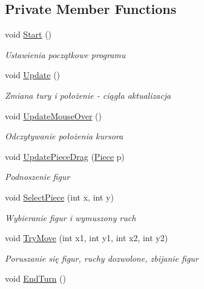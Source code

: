 \subsection*{Private Member Functions}
\begin{DoxyCompactItemize}
\item 
void \mbox{\hyperlink{class_checkers_board_ac7cf49c7fdf75af75997b2fb2fba0d2e}{Start}} ()
\begin{DoxyCompactList}\small\item\em Ustawienia początkowe programu \end{DoxyCompactList}\item 
void \mbox{\hyperlink{class_checkers_board_acb916ec6544b35e39f2eba5f855eed73}{Update}} ()
\begin{DoxyCompactList}\small\item\em Zmiana tury i położenie -\/ ciągła aktualizacja \end{DoxyCompactList}\item 
void \mbox{\hyperlink{class_checkers_board_aa23396a0d7ea31dc496f4204b78fe1ba}{Update\+Mouse\+Over}} ()
\begin{DoxyCompactList}\small\item\em Odczytywanie położenia kursora \end{DoxyCompactList}\item 
void \mbox{\hyperlink{class_checkers_board_a0f4c37cf6ad7e2b7a275c926b1dd056d}{Update\+Piece\+Drag}} (\mbox{\hyperlink{class_piece}{Piece}} p)
\begin{DoxyCompactList}\small\item\em Podnoszenie figur \end{DoxyCompactList}\item 
void \mbox{\hyperlink{class_checkers_board_a67e9f8275c139676479212ee5d07932c}{Select\+Piece}} (int x, int y)
\begin{DoxyCompactList}\small\item\em Wybieranie figur i wymuszony ruch \end{DoxyCompactList}\item 
void \mbox{\hyperlink{class_checkers_board_adc47a5016166e41a7848549af77bb993}{Try\+Move}} (int x1, int y1, int x2, int y2)
\begin{DoxyCompactList}\small\item\em Poruszanie się figur, ruchy dozwolone, zbijanie figur \end{DoxyCompactList}\item 
void \mbox{\hyperlink{class_checkers_board_a149bffb6407cae2045c8545a90306d82}{End\+Turn}} ()

\end{DoxyCompactItemize}
